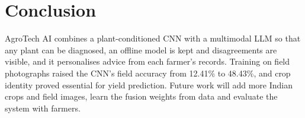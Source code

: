 \documentclass[conference]{IEEEtran}
\begin{document}
\section{Conclusion}
AgroTech AI combines a plant-conditioned CNN with a multimodal LLM so that any plant can be diagnosed, an offline model is kept and disagreements are visible, and it personalises advice from each farmer's records. Training on field photographs raised the CNN's field accuracy from 12.41\% to 48.43\%, and crop identity proved essential for yield prediction. Future work will add more Indian crops and field images, learn the fusion weights from data and evaluate the system with farmers.



\end{document}
